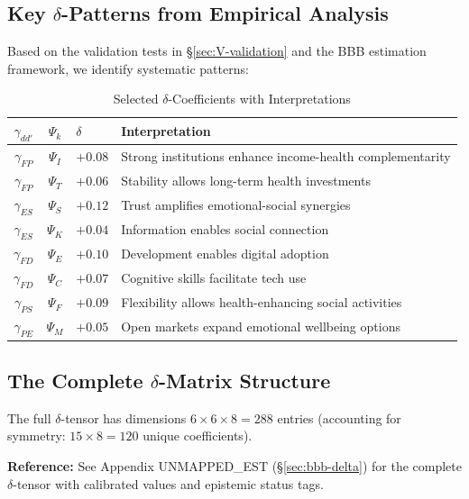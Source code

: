 \subsection{Key $\delta$-Patterns from Empirical Analysis}

Based on the validation tests in \S\ref{sec:V-validation} and the BBB estimation 
framework, we identify systematic patterns:

\begin{table}[htbp]
\centering
\caption{Selected $\delta$-Coefficients with Interpretations}
\label{tab:V-delta-selected}
\small
\renewcommand{\arraystretch}{1.2}
\begin{tabular}{@{}cclp{5cm}@{}}
\toprule
\textbf{$\gamma_{dd'}$} & \textbf{$\Psi_k$} & \textbf{$\delta$} & \textbf{Interpretation} \\
\midrule
$\gamma_{FP}$ & $\Psi_I$ & $+0.08$ & Strong institutions enhance income-health complementarity \\
$\gamma_{FP}$ & $\Psi_T$ & $+0.06$ & Stability allows long-term health investments \\
$\gamma_{ES}$ & $\Psi_S$ & $+0.12$ & Trust amplifies emotional-social synergies \\
$\gamma_{ES}$ & $\Psi_K$ & $+0.04$ & Information enables social connection \\
$\gamma_{FD}$ & $\Psi_E$ & $+0.10$ & Development enables digital adoption \\
$\gamma_{FD}$ & $\Psi_C$ & $+0.07$ & Cognitive skills facilitate tech use \\
$\gamma_{PS}$ & $\Psi_F$ & $+0.09$ & Flexibility allows health-enhancing social activities \\
$\gamma_{PE}$ & $\Psi_M$ & $+0.05$ & Open markets expand emotional wellbeing options \\
\bottomrule
\end{tabular}
\end{table}

\subsection{The Complete $\delta$-Matrix Structure}

The full $\delta$-tensor has dimensions $6 \times 6 \times 8 = 288$ entries 
(accounting for symmetry: $15 \times 8 = 120$ unique coefficients).

\textbf{Reference:} See Appendix UNMAPPED_EST (\S\ref{sec:bbb-delta}) for the complete 
$\delta$-tensor with calibrated values and epistemic status tags.

